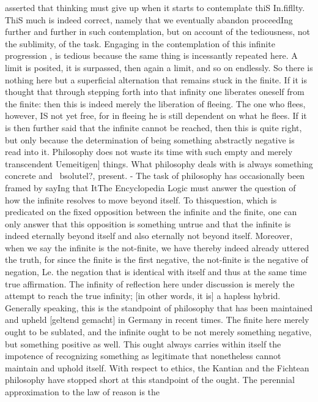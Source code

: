 asserted that thinking must give up when it starts to contemplate thiS In.fifllty. ThiS
much is indeed correct, namely that we eventually abandon proceedIng further
and further in such contemplation, but on account of the tediousness, not the
sublimity, of the task. Engaging in the contemplation of this infinite progression
, is tedious because the same thing is incessantly repeated here. A limit is posited,
it is surpassed, then again a limit, and so on endlessly. So there is nothing here
but a superficial alternation that remains stuck in the finite. If it is thought that
through stepping forth into that infinity one liberates oneself from the finite: then
this is indeed merely the liberation of fleeing. The one who flees, however, IS not
yet free, for in fleeing he is still dependent on what he flees. If it is then further said
that the infinite cannot be reached, then this is quite right, but only because the
determination of being something abstractly negative is read into it. Philosophy
does not waste its time with such empty and merely transcendent Uemeitigen]
things. What philosophy deals with is always something concrete and ~bsolutel?,
present. - The task of philosophy has occasionally been framed by sayIng that ItThe Encyclopedia Logic
must answer the question of how the infinite resolves to move beyond itself. To
thisquestion, which is predicated on the fixed opposition between the infinite and
the finite, one can only answer that this opposition is something untrue and that
the infinite is indeed eternally beyond itself and also eternally not beyond itself.
Moreover, when we say the infinite is the not-finite, we have thereby indeed
already uttered the truth, for since the finite is the first negative, the not-finite is
the negative of negation, Le. the negation that is identical with itself and thus at
the same time true affirmation.
The infinity of reflection here under discussion is merely the attempt to reach the
true infinity; [in other words, it is] a hapless hybrid. Generally speaking, this is the
standpoint of philosophy that has been maintained and upheld [geltend gemacht]
in Germany in recent times. The finite here merely ought to be sublated, and the
infinite ought to be not merely something negative, but something positive as well.
This ought always carries within itself the impotence of recognizing something
as legitimate that nonetheless cannot maintain and uphold itself. With respect
to ethics, the Kantian and the Fichtean philosophy have stopped short at this
standpoint of the ought. The perennial approximation to the law of reason is the
